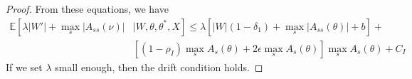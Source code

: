 \begin{proof}
From these equations, we have
\begin{align*}
  \mathbb{E}\left[\lambda |W'| + \max_s |A_{ss}(\nu)|\right. & \left.| W, \theta, \theta^*, X\right] \leq 
  \lambda \left[|W|(1 - \delta_1) +  \max_s|A_{ss}(\theta)| + b\right] + \\
  &\left[(1-\rho_I) \max_sA_s(\theta)  +2 \epsilon \max_sA_s(\theta)
\right] \max_sA_s(\theta) + C_I 
\end{align*}
If we set  $\lambda$ small enough, then the drift condition holds.
\end{proof}
